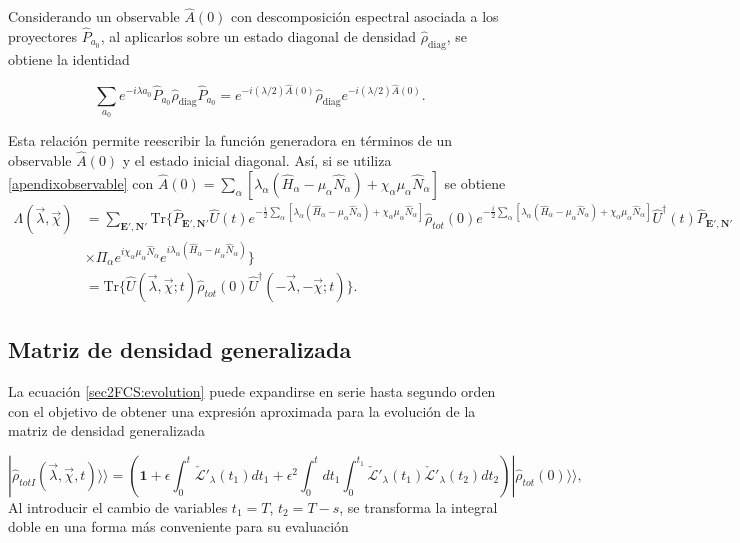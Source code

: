 \begin{appendixs}
Considerando un observable $\hat{A}(0)$ con descomposición espectral asociada a los proyectores $\hat{P}_{a_0}$, al aplicarlos sobre un estado diagonal de densidad $\hat{\rho}_{\text{diag}}$, se obtiene la identidad\cite{esposito2009nonequilibrium}

\begin{equation}
    \sum_{a_0} e^{-i\lambda a_0} \hat{P}_{a_0} \hat{\rho}_{\text{diag}} \hat{P}_{a_0} 
    = e^{-i(\lambda/2)\hat{A}(0)} \hat{\rho}_{\text{diag}} e^{-i(\lambda/2)\hat{A}(0)}.
    \label{apendixobservable}
\end{equation}

Esta relación permite reescribir la función generadora en términos de un observable $\hat{A}(0)$ y el estado inicial diagonal. Así, si se utiliza \ref{apendixobservable} con $\hat{A}(0) = \sum_{\alpha}[\lambda_{\alpha}(\hat{H}_{\alpha}-\mu_{\alpha}\hat{N}_{\alpha}) + \chi_{\alpha}\mu_{\alpha}\hat{N}_{\alpha}] $ se obtiene 
\begin{align*}
    \Lambda(\vec{\lambda},\vec{\chi}) & = \sum_{\textbf{E}',\textbf{N}'}\text{Tr}\{ \hat{P}_{\textbf{E}',\textbf{N}'} \hat{U}(t) e^{-\frac{i}{2}\sum_{\alpha}[\lambda_{\alpha}(\hat{H}_{\alpha} - \mu_{\alpha}\hat{N}_{\alpha}) + \chi_{\alpha}\mu_{\alpha}\hat{N}_{\alpha}  ]}  \hat{\rho}_{tot}(0) e^{-\frac{i}{2}\sum_{\alpha}[\lambda_{\alpha}(\hat{H}_{\alpha} - \mu_{\alpha}\hat{N}_{\alpha}) + \chi_{\alpha}\mu_{\alpha}\hat{N}_{\alpha} ] }\hat{U}^{\dagger}(t) \hat{P}_{\textbf{E}',\textbf{N}'}  \\
    & \times \Pi_{\alpha}e^{i\chi_{\alpha}\mu_{\alpha}\hat{N}_{\alpha}}e^{i\lambda_{\alpha}(\hat{H}_{\alpha} -\mu_{\alpha}\hat{N}_{\alpha})} \} \\
    & = \text{Tr}\{ \hat{U}(\vec{\lambda},\vec{\chi};t)\hat{\rho}_{tot}(0)\hat{U}^{\dagger}(-\vec{\lambda},-\vec{\chi};t)  \}.
\end{align*}

\newpage 

    \subsection{Matriz de densidad generalizada}

La ecuación \ref{sec2FCS:evolution} puede expandirse en serie hasta segundo orden con el objetivo de obtener una expresión aproximada para la evolución de la matriz de densidad generalizada

    \begin{equation*}
        |\hat{\rho}_{totI}(\vec{\lambda},\vec{\chi},t)\rangle \rangle  = \left( \textbf{1} + \epsilon \int_{0}^{t}\check{\mathcal{L}}'_{\lambda}(t_{1})dt_{1} + \epsilon^{2}\int_{0}^{t}dt_{1}\int_{0}^{t_{1}}\check{\mathcal{L}}'_{\lambda}(t_{1})\check{\mathcal{L}}'_{\lambda}(t_{2})dt_{2} \right) |\hat{\rho}_{tot}(0)\rangle \rangle, 
    \end{equation*}
Al introducir el cambio de variables \( t_1 = T \), \( t_2 = T - s \), se transforma la integral doble en una forma más conveniente para su evaluación


\end{appendixs}
